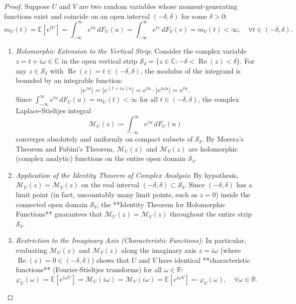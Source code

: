 \documentclass[11pt, letterpaper]{article}
\theoremstyle{definition}
\theoremstyle{remark}
\newcommand{\R}{\mathbb{R}}
\newcommand{\E}{\mathbb{E}}
\begin{document}
\begin{proof}
Suppose $U$ and $V$ are two random variables whose moment-generating functions exist and coincide on an open interval $(-\delta, \delta)$ for some $\delta > 0$:
\[
    m_U(t) = \E[e^{tU}] = \int_{-\infty}^{\infty} e^{tu} \, dF_U(u) = \int_{-\infty}^{\infty} e^{tv} \, dF_V(v) = m_V(t) < \infty, \quad \forall t \in (-\delta, \delta).
\]
\begin{enumerate}[label=\textbf{Step \arabic*:}]
    \item \textit{Holomorphic Extension to the Vertical Strip}: Consider the complex variable $z = t + i\omega \in \mathbb{C}$ in the open vertical strip $\mathcal{S}_\delta = \{z \in \mathbb{C} : -\delta < \operatorname{Re}(z) < \delta\}$. For any $z \in \mathcal{S}_\delta$ with $\operatorname{Re}(z) = t \in (-\delta, \delta)$, the modulus of the integrand is bounded by an integrable function:
    \[
        \big|e^{z u}\big| = \big|e^{(t + i\omega)u}\big| = e^{tu} \cdot \big|e^{i\omega u}\big| = e^{tu}.
    \]
    Since $\int_{-\infty}^\infty e^{tu} \, dF_U(u) = m_U(t) < \infty$ for all $t \in (-\delta, \delta)$, the complex Laplace-Stieltjes integral
    \[
        \mathcal{M}_U(z) \coloneqq \int_{-\infty}^{\infty} e^{zu} \, dF_U(u)
    \]
    converges absolutely and uniformly on compact subsets of $\mathcal{S}_\delta$. By Morera's Theorem and Fubini's Theorem, $\mathcal{M}_U(z)$ and $\mathcal{M}_V(z)$ are holomorphic (complex analytic) functions on the entire open domain $\mathcal{S}_\delta$.
    
    \item \textit{Application of the Identity Theorem of Complex Analysis}: By hypothesis, $\mathcal{M}_U(z) = \mathcal{M}_V(z)$ on the real interval $(-\delta, \delta) \subset \mathcal{S}_\delta$. Since $(-\delta, \delta)$ has a limit point (in fact, uncountably many limit points, such as $z = 0$) inside the connected open domain $\mathcal{S}_\delta$, the **Identity Theorem for Holomorphic Functions** guarantees that $\mathcal{M}_U(z) = \mathcal{M}_V(z)$ throughout the entire strip $\mathcal{S}_\delta$.
    
    \item \textit{Restriction to the Imaginary Axis (Characteristic Functions)}: In particular, evaluating $\mathcal{M}_U(z)$ and $\mathcal{M}_V(z)$ along the imaginary axis $z = i\omega$ (where $\operatorname{Re}(z) = 0 \in (-\delta, \delta)$) shows that $U$ and $V$ have identical **characteristic functions** (Fourier-Stieltjes transforms) for all $\omega \in \R$:
    \[
        \varphi_U(\omega) \coloneqq \E[e^{i\omega U}] = \mathcal{M}_U(i\omega) = \mathcal{M}_V(i\omega) = \E[e^{i\omega V}] \eqqcolon \varphi_V(\omega), \quad \forall \omega \in \R.
    \]
    

\end{enumerate}
\end{proof}
\end{document}
